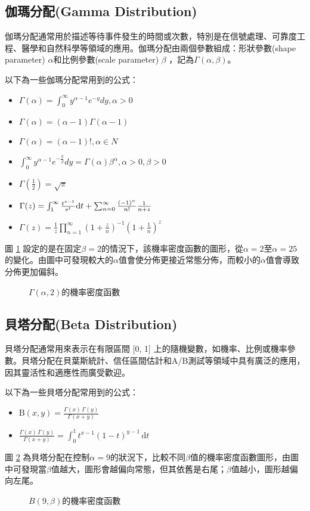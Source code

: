 \documentclass[12pt, a4paper]{article}
\begin{document}
\subsection{伽瑪分配(Gamma Distribution)}
伽瑪分配通常用於描述等待事件發生的時間或次數，特別是在信號處理、可靠度工程、醫學和自然科學等領域的應用。伽瑪分配由兩個參數組成：形狀參數(shape parameter) $\alpha$和比例參數(scale parameter) $\beta$ ，記為$\Gamma(\alpha , \beta )$。

以下為一些伽瑪分配常用到的公式：
\begin{itemize}
\item $\Gamma(\alpha)=\int_{0}^{\infty} y^{\alpha-1}e^{-y}dy,\alpha>0$
\item $\Gamma(\alpha)=(\alpha-1)\Gamma(\alpha-1)$
\item $\Gamma(\alpha)=(\alpha-1)! ,\alpha \in N$
\item $\int_{0}^{\infty} y^{\alpha-1}e^{-\frac{y}{\beta}}dy=\Gamma(\alpha)\beta^{\alpha},\alpha>0,\beta>0$
\item $\Gamma(\frac{1}{2})=\sqrt{\pi}$
\item $\Gamma(z)=\int_{1}^{\infty}\frac{t^{z-1}}{\mathrm{e}^t}{\rm{d}}t+\sum_{n=0}^{\infty}\frac{(-1)^n}{n!}\frac{1}{n+z}$
\item $\Gamma (z)={\frac  {1}{z}}\prod _{{n=1}}^{{\infty }}\left(1+{\frac  {z}{n}}\right)^{{-1}}\left(1+{\frac  {1}{n}}\right)^{{z}}$
\end{itemize}


圖 \ref{fig:gamma-distribution_pdf} 設定的是在固定$\beta =2$的情況下，該機率密度函數的圖形，從$\alpha =2$至$\alpha =25$的變化。由圖中可發現較大的$\alpha$值會使分佈更接近常態分佈，而較小的$\alpha$值會導致分佈更加偏斜。
\begin{figure}[h]
    \caption{$\Gamma(\alpha ,2)$的機率密度函數}
    \label{fig:gamma-distribution_pdf}
\end{figure}
\subsection{貝塔分配(Beta Distribution)}
貝塔分配通常用來表示在有限區間 [0, 1] 上的隨機變數，如機率、比例或機率參數。貝塔分配在貝葉斯統計、信任區間估計和A/B測試等領域中具有廣泛的應用，因其靈活性和適應性而廣受歡迎。

以下為一些貝塔分配常用到的公式：
\begin{itemize}
\item $\mathrm{B} (x,y)={\frac  {\Gamma (x)\,\Gamma (y)}{\Gamma (x+y)}}$
\item ${\frac  {\Gamma (x)\,\Gamma (y)}{\Gamma (x+y)}}{\displaystyle =\int _{0}^{1}t^{x-1}(1-t)^{y-1}\,\mathrm {d} t\!}$
\end{itemize}
圖 \ref{fig:beta-distribution_pdf} 為貝塔分配在控制$\alpha=9$的狀況下，比較不同$\beta$值的機率密度函數圖形，由圖中可發現當$\beta$值越大，圖形會越偏向常態，但其依舊是右尾；$\beta$值越小，圖形越偏向左尾。
\begin{figure}[H]
    \caption{$B(9,\beta)$的機率密度函數}
    \label{fig:beta-distribution_pdf}
\end{figure}
\end{document}
